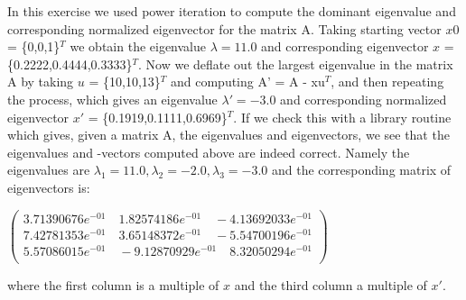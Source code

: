 \documentclass[10pt,a4paper]{article}
\begin{document}
\noindent In this exercise we used power iteration to compute the dominant eigenvalue and corresponding normalized eigenvector for the matrix A. Taking starting vector $x0$ = \{0,0,1\}$^T$ we obtain the eigenvalue $\lambda = 11.0$ and corresponding eigenvector $x$ = \{0.2222,0.4444,0.3333\}$^T$. Now we deflate out the largest eigenvalue in the matrix A by taking $u$ = \{10,10,13\}$^T$ and computing A' = A - xu$^T$, and then repeating the process, which gives an eigenvalue $\lambda ' = -3.0$ and corresponding normalized eigenvector $x'$ = \{0.1919,0.1111,0.6969\}$^{T}$. If we check this with a library routine which gives, given a matrix A, the eigenvalues and eigenvectors, we see that the eigenvalues and -vectors computed above are indeed correct. Namely the eigenvalues are $\lambda_{1} = 11.0, \lambda_{2} = -2.0, \lambda_{3} = -3.0$ and the corresponding matrix of eigenvectors is:\\
\begin{center}
$
\begin{pmatrix}
3.71390676e^{-01}\quad   1.82574186e^{-01}\quad   -4.13692033e^{-01}\\
7.42781353e^{-01}\quad   3.65148372e^{-01}\quad   -5.54700196e^{-01}\\
5.57086015e^{-01}\quad   -9.12870929e^{-01}\quad   8.32050294e^{-01}\\
\end{pmatrix}
$
\end{center}
where the first column is a multiple of $x$ and the third column a multiple of $x'$.
\end{document}
